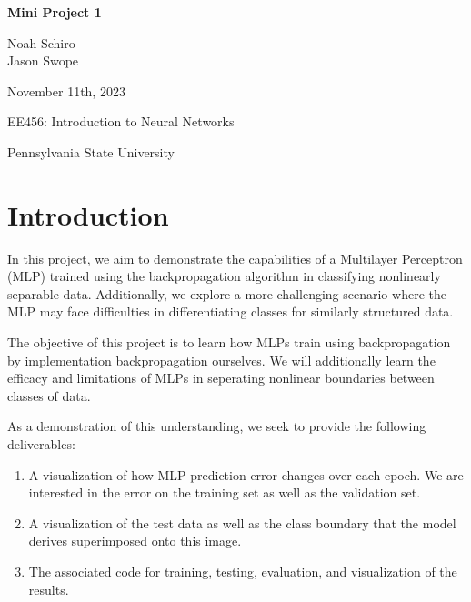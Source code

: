 \documentclass[letterpaper, 12pt]{article}
\begin{document}


\begin{titlepage}
    \begin{center}
        \vspace*{1in}
        \Huge{\textbf{Mini Project 1}}
        
        \vspace{0.5in}
        \Large{Noah Schiro}\\
        \Large{Jason Swope}
        
        \vfill
        
        \normalsize{November 11th, 2023}
        
        \vspace{0.5in}
        
        \normalsize{EE456: Introduction to Neural Networks}
        
        \vspace{0.5in}
        
        \normalsize{Pennsylvania State University}
        
    \end{center}
\end{titlepage}

\newpage

\setlength{\parindent}{5ex}

\section{Introduction}
In this project, we aim to demonstrate the capabilities of a Multilayer Perceptron (MLP) trained using the backpropagation algorithm in classifying nonlinearly separable data. Additionally, we explore a more challenging scenario where the MLP may face difficulties in differentiating classes for similarly structured data.

The objective of this project is to learn how MLPs train using backpropagation by implementation backpropagation ourselves. We will additionally learn the efficacy and limitations of MLPs in seperating nonlinear boundaries between classes of data. 

As a demonstration of this understanding, we seek to provide the following deliverables:

\begin{enumerate}
\item A visualization of how MLP prediction error changes over each epoch. We are interested in the error on the training set as well as the validation set. 
\item A visualization of the test data as well as the class boundary that the model derives superimposed onto this image.
\item The associated code for training, testing, evaluation, and visualization of the results.
\end{enumerate}
\end{document}
